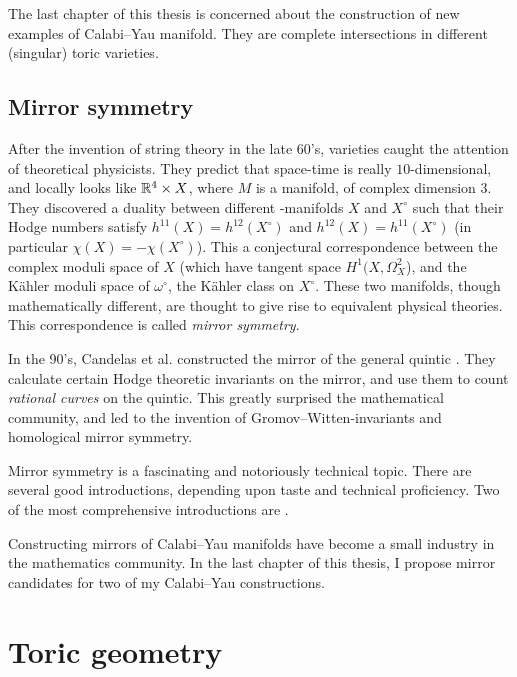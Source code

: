 The last chapter of this thesis is concerned about the construction of new examples of Calabi--Yau manifold. They are complete intersections in different (singular) toric varieties.

\subsection{Mirror symmetry}

After the invention of string theory in the late 60's, \CY varieties caught the attention of theoretical physicists. They predict that space-time is really $10$-dimensional, and locally looks like $\mathbb{R}^4 \times X$, where $M$ is a \CY manifold, of complex dimension $3$. They discovered a duality between different -manifolds $X$ and $X^\circ$ such that their Hodge numbers satisfy $h^{11}(X) = h^{12}(X^\circ)$ and $h^{12}(X)=h^{11}(X^\circ)$ (in particular $\chi(X) = - \chi(X^\circ)$). This a conjectural correspondence between the complex moduli space of $X$ (which have tangent space $H^1(X,\Omega_X^2$), and the Kähler moduli space of $\omega^\circ$, the Kähler class on $X^\circ$. These two manifolds, though mathematically different, are thought to give rise to equivalent physical theories. This correspondence is called \emph{mirror symmetry}.

In the 90's, Candelas et al. constructed the mirror of the general quintic \cite{candelas_string}. They calculate certain Hodge theoretic invariants on the mirror, and use them to count \emph{rational curves} on the quintic. This greatly surprised the mathematical community, and led to the invention of Gromov--Witten-invariants and homological mirror symmetry.

Mirror symmetry is a fascinating and notoriously technical topic. There are several good introductions, depending upon taste and technical proficiency. Two of the most comprehensive introductions are \cite{mirrorsymmetry,mirrorsymmetry_vafa}.

Constructing mirrors of Calabi--Yau manifolds have become a small industry in the mathematics community. In the last chapter of this thesis, I propose mirror candidates for two of my Calabi--Yau constructions. 



\section{Toric geometry} %
\label{sec:toric_geometry}

